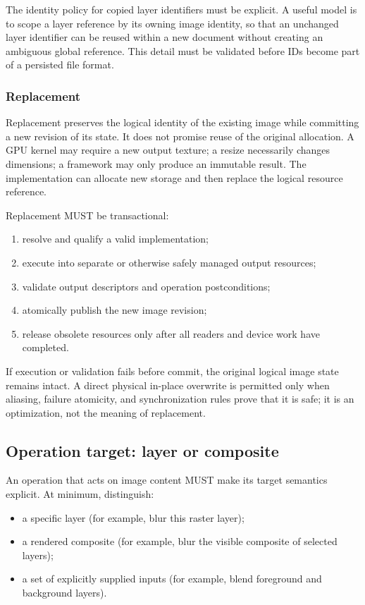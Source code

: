 \documentclass[11pt,a4paper,oneside]{article}
\begin{document}
The identity policy for copied layer identifiers must be explicit. A useful model is to scope a layer reference by its owning image identity, so that an unchanged layer identifier can be reused within a new document without creating an ambiguous global reference. This detail must be validated before IDs become part of a persisted file format.

\subsubsection{Replacement}

Replacement preserves the logical identity of the existing image while committing a new revision of its state. It does not promise reuse of the original allocation. A GPU kernel may require a new output texture; a resize necessarily changes dimensions; a framework may only produce an immutable result. The implementation can allocate new storage and then replace the logical resource reference.

Replacement MUST be transactional:
\begin{enumerate}
  \item resolve and qualify a valid implementation;
  \item execute into separate or otherwise safely managed output resources;
  \item validate output descriptors and operation postconditions;
  \item atomically publish the new image revision;
  \item release obsolete resources only after all readers and device work have completed.
\end{enumerate}

If execution or validation fails before commit, the original logical image state remains intact. A direct physical in-place overwrite is permitted only when aliasing, failure atomicity, and synchronization rules prove that it is safe; it is an optimization, not the meaning of replacement.

\subsection{Operation target: layer or composite}

An operation that acts on image content MUST make its target semantics explicit. At minimum, distinguish:
\begin{itemize}
  \item a specific layer (for example, blur this raster layer);
  \item a rendered composite (for example, blur the visible composite of selected layers);
  \item a set of explicitly supplied inputs (for example, blend foreground and background layers).
\end{itemize}
\end{document}
